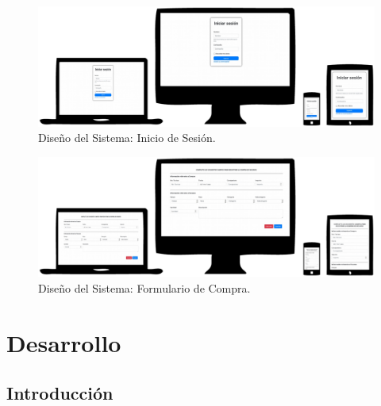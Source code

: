 \documentclass[11pt,oneside]{book}
\begin{document}
\begin{figure}[tbhp]
\centerline{\includegraphics[scale=0.7]{figs/capitulo_2_disenio/loginForm.pdf}}
\caption{Diseño del Sistema: Inicio de Sesión.}
\label{fig204}
\end{figure}

\begin{figure}[tbhp]
\centerline{\includegraphics[scale=0.7]{figs/capitulo_2_disenio/compraForm.pdf}}
\caption{Diseño del Sistema: Formulario de Compra.}
\label{fig205}
\end{figure}

\chapter{Desarrollo}

\section{Introducción}
\end{document}
